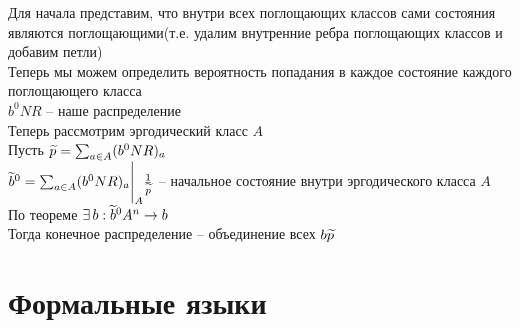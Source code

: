 \documentclass[12pt]{article}
\begin{document}
Для начала представим, что внутри всех поглощающих классов сами состояния являются поглощающими(т.е. удалим внутренние ребра поглощающих классов и добавим петли)\\
Теперь мы можем определить вероятность попадания в каждое состояние каждого поглощающего класса\\
$b^0NR$ -- наше распределение\\
Теперь рассмотрим эргодический класс $A$\\
Пусть $\widetilde p = \sum_{a\in A}(b^0 NR)_a$\\
$\widetilde b^0 = \sum_{a\in A}(b^0 NR)_a \Biggr|_A \frac1{\widetilde p}$ -- начальное состояние внутри эргодического класса $A$\\
По теореме $\exists\, b: \widetilde b^0 A^n \rightarrow b$\\
Тогда конечное распределение -- объединение всех $b\widetilde p$\\
\section{Формальные языки}
\end{document}
